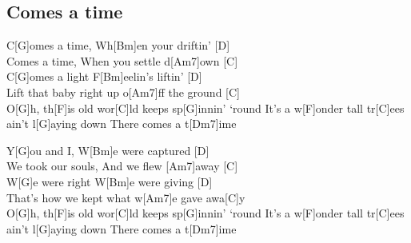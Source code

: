 \subsection*{Comes a time   }
\begin{guitar}
C[G]omes a time, Wh[Bm]en your driftin’ [D]\\
Comes a time, When you settle d[Am7]own [C]\\

C[G]omes a light F[Bm]eelin’s liftin’ [D]\\
Lift that baby right up o[Am7]ff the ground [C]\\



O[G]h, th[F]is old wor[C]ld keeps sp[G]innin’ ‘round 
It’s a w[F]onder tall tr[C]ees ain’t l[G]aying down
There comes a t[Dm7]ime



Y[G]ou and I, W[Bm]e were captured [D]\\
We took our souls, And we flew [Am7]away [C]\\

W[G]e were right W[Bm]e were giving [D]\\
That’s how we kept what w[Am7]e gave awa[C]y\\



O[G]h, th[F]is old wor[C]ld keeps sp[G]innin’ ‘round 
It’s a w[F]onder tall tr[C]ees ain’t l[G]aying down
There comes a t[Dm7]ime
\end{guitar}
